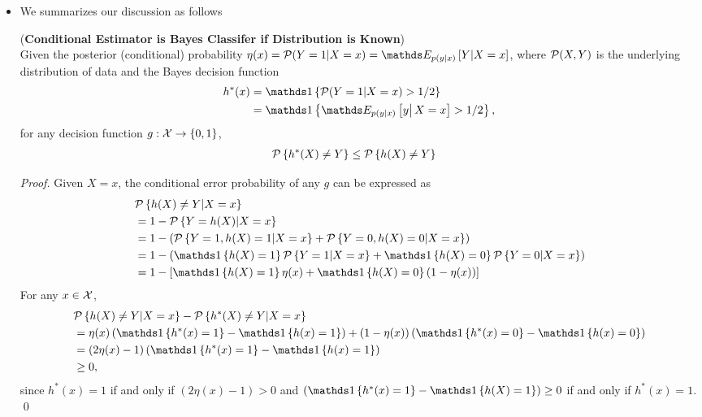 \documentclass[11pt]{article}
\begin{document}
\begin{itemize}
\item We summarizes our discussion as follows
 \begin{proposition} (\textbf{Conditional Estimator is Bayes Classifer if Distribution is Known}) \citep{devroye2013probabilistic}\\
Given the posterior (conditional) probability $\eta(x)= \cP(Y=1|X=x)= \E{p(y|x)}{Y| X=x}$, where ${\mathcal P}(X,Y)$ is the underlying distribution of data and the Bayes decision function  
\begin{align*}
h^{*}(x) &= \ind{\cP(Y=1| X=x)>1/2}\\
&=  \ind{\E{p(y|x)}{y\big|\,X=x}>1/2},
\end{align*}
for any decision function $g: {\mathcal X} \rightarrow \left\{0,1\right\}$, 
\begin{align*}
{\mathcal P}\left\{h^{*}(X)\neq Y\right\} &\le {\mathcal P}\left\{h(X) \neq Y\right\}
\end{align*}
\end{proposition}
\begin{proof}
Given $X=x$, the conditional error probability of any $g$ can be expressed as
\begin{align}
&\cP\set{h(X) \neq Y| X=x}  \nonumber\\
&= 1- \cP\set{ Y= h(X)| X=x }\nonumber\\
&=1- \paren{\cP\set{Y=1, h(X)=1 | X=x}+ \cP\set{Y=0, h(X)=0 | X=x}}\nonumber\\
&=1- \paren{ \ind{h(X)=1}\cP\set{ Y=1 | X=x } + \ind{h(X)=0}\cP\set{ Y=0 | X=x }    } \nonumber\\
&=1- \brac{ \ind{h(X)=1} \eta(x) +  \ind{h(X)=0}\paren{1- \eta(x)}}  \label{expr: Bayes_error_expr}
\end{align}
For any $x\in {\mathcal X}$, 
\begin{align*}
&\cP\set{h(X)\neq Y| X=x} - \cP\set{h^{*}(X)\neq Y| X=x}\\
&= \eta(x)\paren{  \ind{h^{*}(x)=1} -  \ind{h(x)=1}  }+ (1-\eta(x))\paren{\ind{h^{*}(x)=0} -  \ind{h(x)=0}}\\
&= (2\eta(x)-1)\paren{ \ind{h^{*}(x)=1} -  \ind{h(x)=1}  }\\
&\ge 0,
\end{align*}
since $h^{*}(x)=1$ if and only if $(2\eta(x)-1)>0$ and $\paren{ \ind{h^{*}(x)=1} -  \ind{h(X)=1}  }\ge 0$ if and only if $h^{*}(x)=1$. \qed
\end{proof}


\end{itemize}
\end{document}
